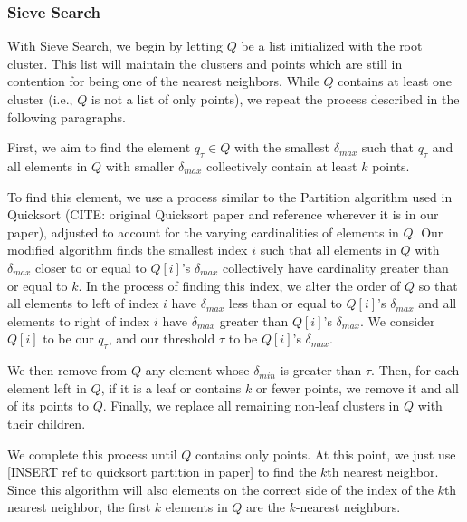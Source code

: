 \subsubsection{Sieve Search}
\label{subsubsec:methods:knn-search:sieve}
With Sieve Search, we begin by letting $Q$ be a list initialized with the root cluster. This list will maintain the 
clusters and points which are still in contention for being one of the nearest neighbors.
While $Q$ contains at least one cluster (i.e., $Q$ is not a list of only points), we repeat the process described in 
the following paragraphs. 

First, 
we aim to find the element $q_{\tau} \in Q$ with the smallest $\delta_{max}$ such that 
$q_{\tau}$ and all elements in $Q$ with smaller $\delta_{max}$ collectively contain at least $k$ points. 

To find this element, 
we use a process similar to the Partition algorithm used in Quicksort (CITE: original Quicksort paper and reference wherever it is 
in our paper), adjusted to account for the varying cardinalities of elements in $Q$. Our modified algorithm finds the smallest index $i$ such 
that all elements in $Q$ with $\delta_{max}$ closer to or equal to $Q[i]$'s $\delta_{max}$ collectively have cardinality greater
than or equal to $k$. In the process of finding this index, we alter the order of $Q$ so that all elements to left
of index $i$ have $\delta_{max}$ less than or equal to $Q[i]$'s $\delta_{max}$ and all elements to right of index $i$
have $\delta_{max}$ greater than $Q[i]$'s $\delta_{max}$. We consider $Q[i]$ to be our $q_{\tau}$, and our threshold 
$\tau$ to be $Q[i]$'s $\delta_{max}$.

We then remove from $Q$ any element whose $\delta_{min}$ is greater than $\tau$. Then, for each element left 
in $Q$, if it is a leaf or contains $k$ or fewer points, we remove it and all of its points to $Q$. Finally, we
replace all remaining non-leaf clusters in $Q$ with their children. 

We complete this process until $Q$ contains only points. At this point, we 
just use [INSERT ref to quicksort partition in paper] to find the $k$th 
nearest neighbor. Since this algorithm will also elements on the correct side of 
the index of the $k$th nearest neighbor, the first $k$ elements in $Q$ are the $k$-nearest neighbors.


